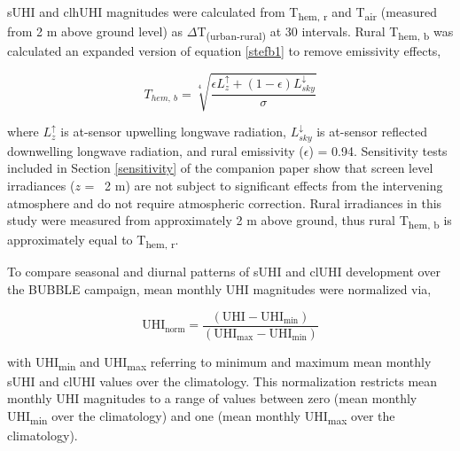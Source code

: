 \begin{bibunit}
sUHI and clhUHI magnitudes were calculated from T\textsubscript{hem, r} and T\textsubscript{air} (measured from 2 \si{\meter} above ground level) as $\Delta$T\textsubscript{(urban-rural)} at 30 \si{\min} intervals. Rural T\textsubscript{hem, b} was calculated an expanded version of equation \ref{stefb1} to remove emissivity effects,

\begin{equation}
\label{ruralt}
T_{hem,~ b} = \sqrt[4]{\frac{\epsilon L_z^\uparrow + (1 - \epsilon)L_{sky}^\downarrow}{\sigma}}
\end{equation}

\noindent where $L_z^\uparrow$ is at-sensor upwelling longwave radiation, $L_{sky}^\downarrow$ is at-sensor reflected downwelling longwave radiation, and rural emissivity ($\epsilon$) = 0.94. Sensitivity tests included in Section \ref{sensitivity} of the companion paper show that screen level irradiances ($ z $ = ~2 \si{\meter}) are not subject to significant effects from the intervening atmosphere and do not require atmospheric correction. Rural irradiances in this study were measured from approximately 2 \si{\meter} above ground, thus rural T\textsubscript{hem, b} is approximately equal to T\textsubscript{hem, r}. 

To compare seasonal and diurnal patterns of sUHI and clUHI development over the BUBBLE campaign, mean monthly UHI magnitudes were normalized via,

\begin{equation}
\text{UHI}_{\text{norm}} = \frac{(\text{UHI} - \text{UHI}_{\text{min}})}{(\text{UHI}_{\text{max}} - \text{UHI}_{\text{min}})}
\label{uhinorm}
\end{equation}

\noindent with UHI\textsubscript{min} and UHI\textsubscript{max} referring to minimum and maximum mean monthly sUHI and clUHI values over the climatology. This normalization restricts mean monthly UHI magnitudes to a range of values between zero (mean monthly UHI\textsubscript{min} over the climatology) and one (mean monthly UHI\textsubscript{max} over the climatology).


\end{bibunit}
